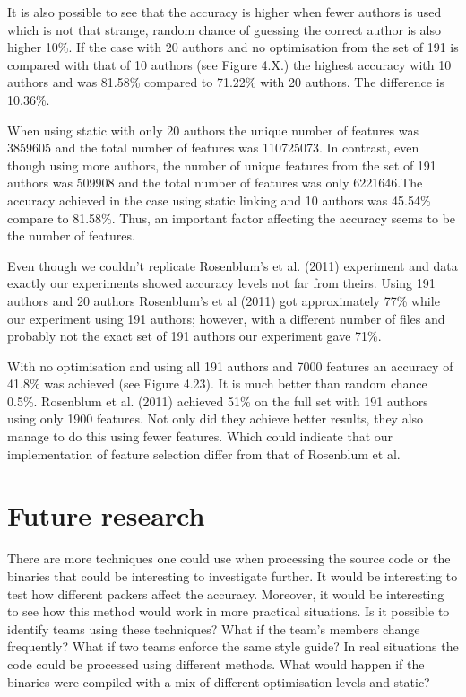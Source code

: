 \documentclass[a4paper,11pt]{kth-mag}
\begin{document}
It is also possible to see that the accuracy is higher when fewer authors is
used which is not that strange, random chance of guessing the correct author is
also higher 10\%. If the case with 20 authors and no optimisation from the set
of 191 is compared with that of 10 authors (see Figure 4.X.) the highest
accuracy with 10 authors and was 81.58\% compared to 71.22\% with 20 authors.
The difference is 10.36\%.

When using static with only 20 authors the unique number of features was
3859605 and the total number of features was 110725073. In contrast, even
though using more authors,  the number of unique features from the set of 191
authors was 509908 and the total number of features was only 6221646.The
accuracy achieved in the case using static linking and 10 authors was 45.54\%
compare to 81.58\%. Thus, an important factor affecting the accuracy seems to
be the number of features. 

Even though we couldn’t replicate Rosenblum’s et al. (2011) experiment and data
exactly our experiments showed accuracy levels not far from theirs. Using 191
authors and 20 authors Rosenblum’s et al (2011) got approximately 77\% while
our experiment using 191 authors; however, with a different number of files and
probably not the exact set of 191 authors our experiment gave 71\%.     

With no optimisation and using all 191 authors and 7000 features an accuracy of
41.8\% was achieved (see Figure 4.23). It is much better than random chance
0.5\%. Rosenblum et al. (2011) achieved 51\% on the full set with 191 authors
using only 1900 features. Not only did they achieve better results, they also
manage to do this using fewer features. Which could indicate that our
implementation of feature selection differ from that of Rosenblum et al.

\section{Future research}
There are more techniques one could use when processing the source code or the
binaries that could be interesting to investigate further. It would be
interesting to test how different packers affect the accuracy. Moreover, it
would be interesting to see how this method would work in more practical
situations. Is it possible to identify teams using these techniques? What if
the team’s members change frequently? What if two teams enforce the same style
guide? In real situations the code could be processed using different methods.
What would happen if the binaries were compiled with a mix of different
optimisation levels and static?  
\end{document}
